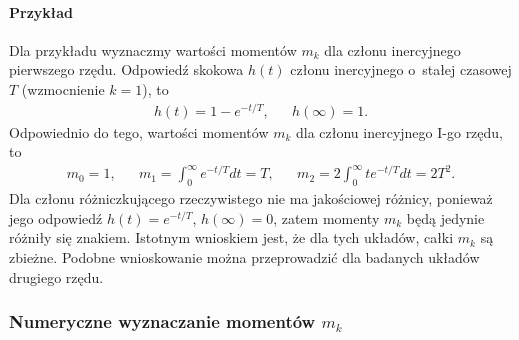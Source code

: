 \documentclass[paper=a4,DIV=12]{lpas}
\begin{document}
\begin{appendices}
  \paragraph{Przykład} Dla przykładu wyznaczmy wartości momentów $m_k$ dla
  członu inercyjnego pierwszego rzędu. Odpowiedź skokowa $h(t)$ członu
  inercyjnego o~stałej czasowej $T$ (wzmocnienie $k=1$), to
  \begin{equation}
    \begin{aligned}
      & h(t) = 1 - e^{-t/T}, && h(\infty) = 1. &
    \end{aligned}
  \end{equation}
  Odpowiednio do tego, wartości momentów $m_k$ dla członu inercyjnego I-go
  rzędu, to
  \begin{equation}
    \begin{aligned}
      & m_0 = 1,   &
      & m_1 = \int_0^{\infty}{e^{-t/T} dt} = T,   &
      & m_2 = 2 \int_0^{\infty} {t e^{-t/T}dt} = 2 T^2. &
    \end{aligned}
  \end{equation}
  Dla członu różniczkującego rzeczywistego nie ma jakościowej różnicy, ponieważ
  jego odpowiedź $h(t) = e^{-t/T}$, $h(\infty) = 0$, zatem momenty $m_k$ będą
  jedynie różniły się znakiem. Istotnym wnioskiem jest, że dla tych układów,
  całki $m_k$ są zbieżne. Podobne wnioskowanie można przeprowadzić dla badanych
  układów drugiego rzędu.

  \subsubsection{Numeryczne wyznaczanie momentów \texorpdfstring{$m_k$}{mk}}
  \label{eq:MTP2Q}


\end{appendices}
\end{document}
